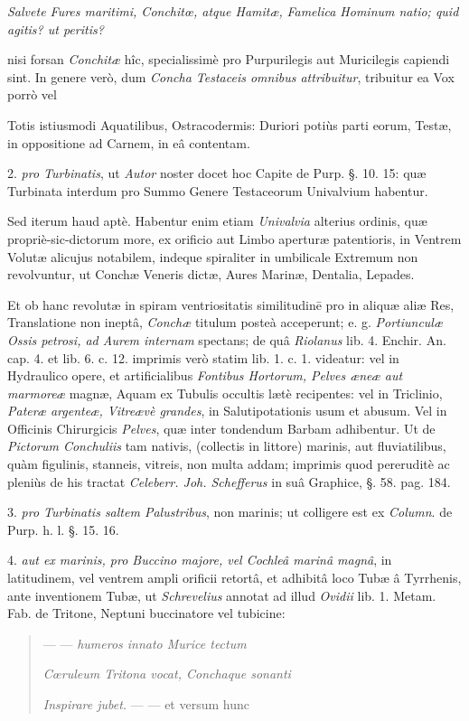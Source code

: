 \documentclass[a4paper, 11pt, oneside, polutonikogreek, german]{article}
\begin{document}
\emph{Salvete Fures maritimi, Conchitœ, atque Hamitæ,}  
\emph{Famelica Hominum natio; quid agitis? ut peritis?}

nisi forsan \emph{Conchitæ} hîc, specialissimè pro Purpurilegis aut Muricilegis capiendi sint. In genere verò, dum \emph{Concha Testaceis omnibus attribuitur}, tribuitur ea Vox porrò vel

Totis istiusmodi Aquatilibus, Ostracodermis: Duriori potiùs parti eorum, Testæ, in oppositione ad Carnem, in eâ contentam.

2. \emph{pro Turbinatis}, ut \emph{Autor} noster docet hoc Capite de Purp. §. 10. 15: quæ Turbinata interdum pro Summo Genere Testaceorum Univalvium habentur.

Sed iterum haud aptè. Habentur enim etiam \emph{Univalvia} alterius ordinis, quæ propriè-sic-dictorum more, ex orificio aut Limbo aperturæ patentioris, in Ventrem Volutæ alicujus notabilem, indeque spiraliter in umbilicale Extremum non revolvuntur, ut Conchæ Veneris dictæ, Aures Marinæ, Dentalia, Lepades.

Et ob hanc revolutæ in spiram ventriositatis similitudinē pro in aliquæ aliæ Res, Translatione non ineptâ, \emph{Conchæ} titulum posteà acceperunt; e. g. \emph{Portiunculæ Ossis petrosi, ad Aurem internam} spectans; de quâ \emph{Riolanus} lib. 4. Enchir. An. cap. 4. et lib. 6. c. 12. imprimis verò statim lib. 1. c. 1. videatur: vel in Hydraulico opere, et artificialibus \emph{Fontibus Hortorum, Pelves æneæ aut marmoreæ} magnæ, Aquam ex Tubulis occultis lætè recipentes: vel in Triclinio, \emph{Pateræ argenteæ, Vitreævè grandes}, in Salutipotationis usum et abusum. Vel in Officinis Chirurgicis \emph{Pelves}, quæ inter tondendum Barbam adhibentur. Ut de \emph{Pictorum Conchuliis} tam nativis, (collectis in littore) marinis, aut fluviatilibus, quàm figulinis, stanneis, vitreis, non multa addam; imprimis quod pereruditè ac pleniùs de his tractat \emph{Celeberr. Joh. Schefferus} in suâ Graphice, §. 58. pag. 184.

3. \emph{pro Turbinatis saltem Palustribus}, non marinis; ut colligere est ex \emph{Column}. de Purp. h. l. §. 15. 16.

4. \emph{aut ex marinis, pro Buccino majore, vel Cochleâ marinâ magnâ}, in latitudinem, vel ventrem ampli orificii retortâ, et adhibitâ loco Tubæ â Tyrrhenis, ante inventionem Tubæ, ut \emph{Schrevelius} annotat ad illud \emph{Ovidii} lib. 1. Metam. Fab. de Tritone, Neptuni buccinatore vel tubicine:
\begin{quotation}
--- --- \emph{humeros innato Murice tectum}

\emph{Cœruleum Tritona vocat, Conchaque sonanti}

\emph{Inspirare jubet.} --- --- et versum hunc
\end{quotation}
\end{document}
